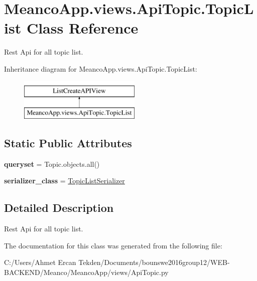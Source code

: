 \hypertarget{class_meanco_app_1_1views_1_1_api_topic_1_1_topic_list}{}\section{Meanco\+App.\+views.\+Api\+Topic.\+Topic\+List Class Reference}
\label{class_meanco_app_1_1views_1_1_api_topic_1_1_topic_list}


Rest Api for all topic list.  


Inheritance diagram for Meanco\+App.\+views.\+Api\+Topic.\+Topic\+List\+:\begin{figure}[H]
\begin{center}
\leavevmode
\includegraphics[height=2.000000cm]{class_meanco_app_1_1views_1_1_api_topic_1_1_topic_list}
\end{center}
\end{figure}
\subsection*{Static Public Attributes}
\begin{DoxyCompactItemize}
\item 
\hypertarget{class_meanco_app_1_1views_1_1_api_topic_1_1_topic_list_aab9c2a14ccd3e7f0184ed0ff11892d09}{}\label{class_meanco_app_1_1views_1_1_api_topic_1_1_topic_list_aab9c2a14ccd3e7f0184ed0ff11892d09} 
{\bfseries queryset} = Topic.\+objects.\+all()
\item 
\hypertarget{class_meanco_app_1_1views_1_1_api_topic_1_1_topic_list_a51e3db92fbc6bf81aa2b40d70b098976}{}\label{class_meanco_app_1_1views_1_1_api_topic_1_1_topic_list_a51e3db92fbc6bf81aa2b40d70b098976} 
{\bfseries serializer\+\_\+class} = \hyperlink{class_meanco_app_1_1serializers_1_1_topic_list_serializer}{Topic\+List\+Serializer}
\end{DoxyCompactItemize}


\subsection{Detailed Description}
Rest Api for all topic list. 



The documentation for this class was generated from the following file\+:\begin{DoxyCompactItemize}
\item 
C\+:/\+Users/\+Ahmet Ercan Tekden/\+Documents/bounswe2016group12/\+W\+E\+B-\/\+B\+A\+C\+K\+E\+N\+D/\+Meanco/\+Meanco\+App/views/Api\+Topic.\+py\end{DoxyCompactItemize}
